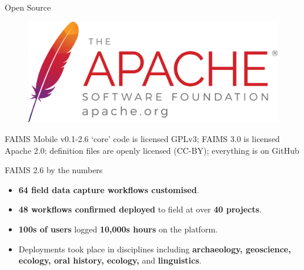 \begin{frame}{Open Source}
 \begin{figure}[H]
    \centering
        \includegraphics[width=.65\textwidth]{figures/asf_logo_url.png}
        
        \label{fig:FAIMS-github-OSS}
 \end{figure}
 
FAIMS Mobile v0.1-2.6 `core' code is licensed GPLv3; FAIMS 3.0 is licensed Apache 2.0; definition files are openly licensed (CC-BY); everything is on GitHub 

\end{frame}


\begin{frame}{FAIMS 2.6 by the numbers}
 \begin{itemize}
        \item \textbf{64 field data capture workflows customised}.
        \item \textbf{48 workflows confirmed deployed} to field at over \textbf{40 projects}.
        \item \textbf{100s of users} logged \textbf{10,000s hours} on the platform.
        \item Deployments took place in disciplines including \textbf{archaeology, geoscience, ecology, oral history, ecology, }and \textbf{linguistics}.
    \end{itemize}
\end{frame}



